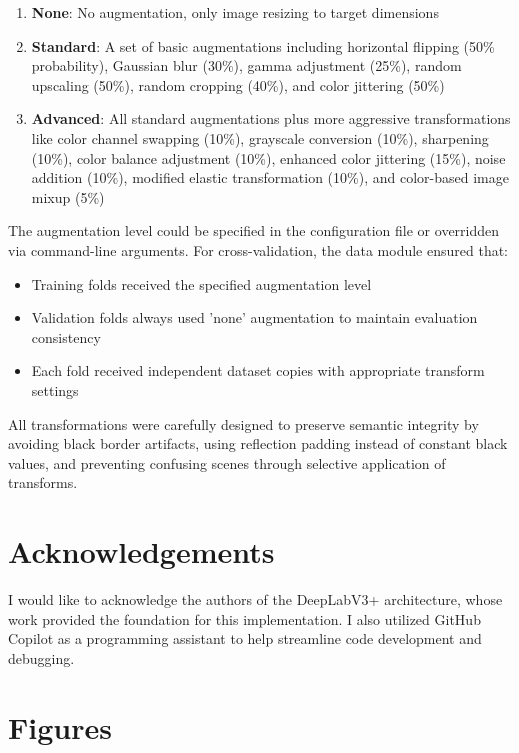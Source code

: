 \documentclass[]{article}
\begin{document}
\begin{enumerate}
    \item \textbf{None}: No augmentation, only image resizing to target dimensions
    \item \textbf{Standard}: A set of basic augmentations including horizontal flipping (50\% probability), Gaussian blur (30\%), gamma adjustment (25\%), random upscaling (50\%), random cropping (40\%), and color jittering (50\%)
    \item \textbf{Advanced}: All standard augmentations plus more aggressive transformations like color channel swapping (10\%), grayscale conversion (10\%), sharpening (10\%), color balance adjustment (10\%), enhanced color jittering (15\%), noise addition (10\%), modified elastic transformation (10\%), and color-based image mixup (5\%)
\end{enumerate}

The augmentation level could be specified in the configuration file or overridden via command-line arguments. For cross-validation, the data module ensured that:
\begin{itemize}
    \item Training folds received the specified augmentation level
    \item Validation folds always used 'none' augmentation to maintain evaluation consistency
    \item Each fold received independent dataset copies with appropriate transform settings
\end{itemize}

All transformations were carefully designed to preserve semantic integrity by avoiding black border artifacts, using reflection padding instead of constant black values, and preventing confusing scenes through selective application of transforms.



\section{Acknowledgements}
I would like to acknowledge the authors of the DeepLabV3+ architecture, whose work provided the foundation for this implementation. I also utilized GitHub Copilot as a programming assistant to help streamline code development and debugging.
\section{Figures}\label{sec:Figures}
\end{document}
